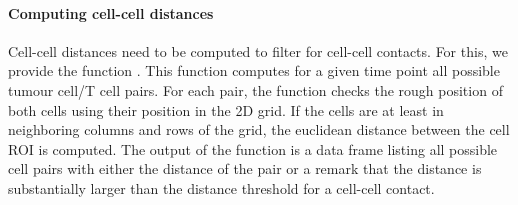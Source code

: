 \documentclass{report}
\begin{document}
%
%	
%	
%	

\paragraph{Computing cell-cell distances}
Cell-cell distances need to be computed to filter for cell-cell contacts. For this, we provide the function . This function computes for a given time point all possible tumour cell/T cell pairs. For each pair, the function checks the rough position of both cells using their position in the 2D grid. If the cells are at least in neighboring columns and rows of the grid, the euclidean distance between the cell ROI is computed.
The output of the function is a data frame listing all possible cell pairs with either the distance of the pair or a remark that the distance is substantially larger than the distance threshold for a cell-cell contact.

%                              
\end{document}
